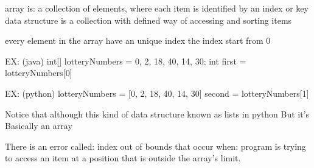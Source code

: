 array is:
  a collection of elements, where each item is identified by an index or key
  data structure is a collection with defined way of accessing and sorting items
  
  every element in the array have an unique index 
  the index start from 0 

  EX:  (java)
    int[] lotteryNumbers = {0, 2, 18, 40, 14, 30};
    int first = lotteryNumbers[0]

  EX:  (python)
    lotteryNumbers = [0, 2, 18, 40, 14, 30]
    second = lotteryNumbers[1]

  Notice that 
    although this kind of data structure known as lists in python 
    But it's Basically an array

There is an error called: index out of bounds that occur when:
  program is trying to access an item at a position that is outside the array's limit.  